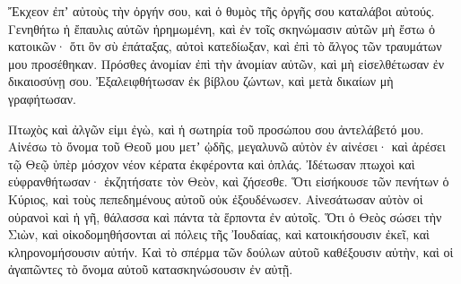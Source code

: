 {Ἔκχεον ἐπʼ αὐτοὺς τὴν ὀργήν σου, καὶ ὁ θυμὸς τῆς ὀργῆς σου καταλάβοι αὐτούς.
Γενηθήτω ἡ ἔπαυλις αὐτῶν ἠρημωμένη, καὶ ἐν τοῖς σκηνώμασιν αὐτῶν μὴ ἔστω ὁ κατοικῶν·
ὅτι ὃν σὺ ἐπάταξας, αὐτοὶ κατεδίωξαν, καὶ ἐπὶ τὸ ἄλγος τῶν τραυμάτων μου προσέθηκαν.
Πρόσθες ἀνομίαν ἐπὶ τὴν ἀνομίαν αὐτῶν, καὶ μὴ εἰσελθέτωσαν ἐν δικαιοσύνῃ σου.
Ἐξαλειφθήτωσαν ἐκ βίβλου ζώντων, καὶ μετὰ δικαίων μὴ γραφήτωσαν.
\par }{\PP {}Πτωχὸς καὶ ἀλγῶν εἰμι ἐγὼ, καὶ ἡ σωτηρία τοῦ προσώπου σου ἀντελάβετό μου.
Αἰνέσω τὸ ὄνομα τοῦ Θεοῦ μου μετʼ ᾠδῆς, μεγαλυνῶ αὐτὸν ἐν αἰνέσει·
καὶ ἀρέσει τῷ Θεῷ ὑπὲρ μόσχον νέον κέρατα ἐκφέροντα καὶ ὁπλάς.
Ἰδέτωσαν πτωχοὶ καὶ εὐφρανθήτωσαν· ἐκζητήσατε τὸν Θεὸν, καὶ ζήσεσθε.
Ὅτι εἰσήκουσε τῶν πενήτων ὁ Κύριος, καὶ τοὺς πεπεδημένους αὐτοῦ οὐκ ἐξουδένωσεν.
Αἰνεσάτωσαν αὐτὸν οἱ οὐρανοὶ καὶ ἡ γῆ, θάλασσα καὶ πάντα τὰ ἕρποντα ἐν αὐτοῖς.
Ὅτι ὁ Θεὸς σώσει τὴν Σιὼν, καὶ οἰκοδομηθήσονται αἱ πόλεις τῆς Ἰουδαίας, καὶ κατοικήσουσιν ἐκεῖ, καὶ κληρονομήσουσιν αὐτήν.
Καὶ τὸ σπέρμα τῶν δούλων αὐτοῦ καθέξουσιν αὐτὴν, καὶ οἱ ἀγαπῶντες τὸ ὄνομα αὐτοῦ κατασκηνώσουσιν ἐν αὐτῇ.

\par }
